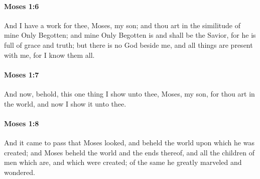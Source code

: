 		\paragraph{Moses 1:6} %
			\label{MOSES-1-6}

			And I have a work for thee, Moses, my son; and thou art in the similitude of mine Only Begotten; and mine Only Begotten is and shall be the Savior, for he is full of grace and truth; but there is no God beside me, and all things are present with me, for I know them all.


		\paragraph{Moses 1:7} %
			\label{MOSES-1-7}

			And now, behold, this one thing I show unto thee, Moses, my son, for thou art in the world, and now I show it unto thee.


		\paragraph{Moses 1:8} %
			\label{MOSES-1-8}

			And it came to pass that Moses looked, and beheld the world upon which he was created; and Moses beheld the world and the ends thereof, and all the children of men which are, and which were created; of the same he greatly marveled and wondered.


